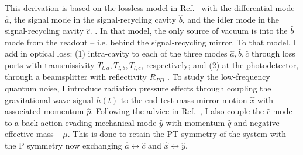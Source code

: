 

This derivation is based on the lossless model in Ref.~\cite{liBroadbandSensitivityImprovement2020} with the differential mode $\hat{a}$, the signal mode in the signal-recycling cavity $\hat{b}$, and the idler mode in the signal-recycling cavity $\hat{c}$. . In that model, the only source of vacuum is into the $\hat{b}$ mode from the readout -- i.e. behind the signal-recycling mirror.
To that model, I add in optical loss: (1) intra-cavity to each of the three modes $\hat{a}, \hat{b}, \hat{c}$ through loss ports  with transmissivity $T_{l,a}, T_{l,b}, T_{l,c}$, respectively; and (2) at the photodetector, through a beamsplitter with reflectivity $R_{PD}$ .
To study the low-frequency quantum noise, I introduce radiation pressure effects through coupling the gravitational-wave signal $h(t)$ to the end test-mass mirror motion $\hat{x}$ with associated momentum $\hat{p}$.
Following the advice  in Ref.~\cite{liBroadbandSensitivityImprovement2020}, I also couple the $\hat{c}$ mode to a back-action evading mechanical mode $\hat{y}$ with momentum $\hat{q}$ and negative effective mass $-\mu$. This is done to retain the PT-symmetry of the system with the P symmetry now exchanging $\hat{a}\leftrightarrow\hat{c}$ and $\hat{x}\leftrightarrow\hat{y}$.


